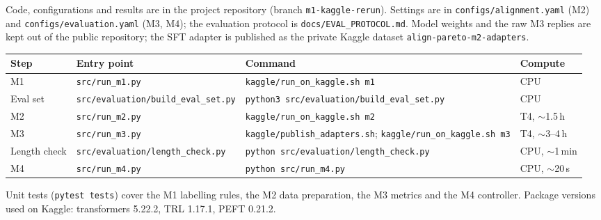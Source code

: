 \documentclass[11pt,a4paper]{article}
\begin{document}
Code, configurations and results are in the project repository (branch \texttt{m1-kaggle-rerun}). Settings are in \texttt{configs/alignment.yaml} (M2) and \texttt{configs/evaluation.yaml} (M3, M4); the evaluation protocol is \texttt{docs/EVAL\_PROTOCOL.md}. Model weights and the raw M3 replies are kept out of the public repository; the SFT adapter is published as the private Kaggle dataset \texttt{align-pareto-m2-adapters}.

\begin{table}[h]
  \centering
  \small
  \begin{tabularx}{\linewidth}{llLl}
    \toprule
    Step & Entry point & Command & Compute \\
    \midrule
    M1 & \texttt{src/run\_m1.py} & \texttt{kaggle/run\_on\_kaggle.sh m1} & CPU \\
    Eval set & \texttt{src/evaluation/build\_eval\_set.py} & \texttt{python3 src/evaluation/build\_eval\_set.py} & CPU \\
    M2 & \texttt{src/run\_m2.py} & \texttt{kaggle/run\_on\_kaggle.sh m2} & T4, $\sim$1.5\,h \\
    M3 & \texttt{src/run\_m3.py} & \texttt{kaggle/publish\_adapters.sh}; \texttt{kaggle/run\_on\_kaggle.sh m3} & T4, $\sim$3--4\,h \\
    Length check & \texttt{src/evaluation/length\_check.py} & \texttt{python src/evaluation/length\_check.py} & CPU, $\sim$1\,min \\
    M4 & \texttt{src/run\_m4.py} & \texttt{python src/run\_m4.py} & CPU, $\sim$20\,s \\
    \bottomrule
  \end{tabularx}
\end{table}

Unit tests (\texttt{pytest tests}) cover the M1 labelling rules, the M2 data preparation, the M3 metrics and the M4 controller. Package versions used on Kaggle: transformers 5.22.2, TRL 1.17.1, PEFT 0.21.2.
\end{document}
